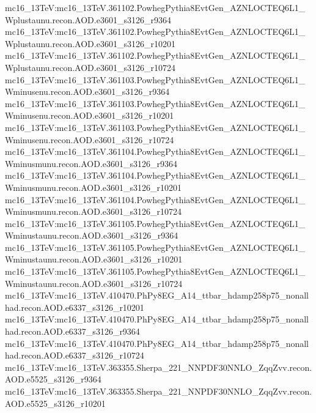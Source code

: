 { mc16\_13TeV:mc16\_13TeV.361102.PowhegPythia8EvtGen\_AZNLOCTEQ6L1\_Wplustaunu.recon.AOD.e3601\_s3126\_r9364\newline    
 mc16\_13TeV:mc16\_13TeV.361102.PowhegPythia8EvtGen\_AZNLOCTEQ6L1\_Wplustaunu.recon.AOD.e3601\_s3126\_r10201\newline    
 mc16\_13TeV:mc16\_13TeV.361102.PowhegPythia8EvtGen\_AZNLOCTEQ6L1\_Wplustaunu.recon.AOD.e3601\_s3126\_r10724\newline    
 mc16\_13TeV:mc16\_13TeV.361103.PowhegPythia8EvtGen\_AZNLOCTEQ6L1\_Wminusenu.recon.AOD.e3601\_s3126\_r9364\newline    
 mc16\_13TeV:mc16\_13TeV.361103.PowhegPythia8EvtGen\_AZNLOCTEQ6L1\_Wminusenu.recon.AOD.e3601\_s3126\_r10201\newline    
 mc16\_13TeV:mc16\_13TeV.361103.PowhegPythia8EvtGen\_AZNLOCTEQ6L1\_Wminusenu.recon.AOD.e3601\_s3126\_r10724\newline    
 mc16\_13TeV:mc16\_13TeV.361104.PowhegPythia8EvtGen\_AZNLOCTEQ6L1\_Wminusmunu.recon.AOD.e3601\_s3126\_r9364\newline    
 mc16\_13TeV:mc16\_13TeV.361104.PowhegPythia8EvtGen\_AZNLOCTEQ6L1\_Wminusmunu.recon.AOD.e3601\_s3126\_r10201\newline    
 mc16\_13TeV:mc16\_13TeV.361104.PowhegPythia8EvtGen\_AZNLOCTEQ6L1\_Wminusmunu.recon.AOD.e3601\_s3126\_r10724\newline    
 mc16\_13TeV:mc16\_13TeV.361105.PowhegPythia8EvtGen\_AZNLOCTEQ6L1\_Wminustaunu.recon.AOD.e3601\_s3126\_r9364\newline    
 mc16\_13TeV:mc16\_13TeV.361105.PowhegPythia8EvtGen\_AZNLOCTEQ6L1\_Wminustaunu.recon.AOD.e3601\_s3126\_r10201\newline    
 mc16\_13TeV:mc16\_13TeV.361105.PowhegPythia8EvtGen\_AZNLOCTEQ6L1\_Wminustaunu.recon.AOD.e3601\_s3126\_r10724\newline    
 mc16\_13TeV:mc16\_13TeV.410470.PhPy8EG\_A14\_ttbar\_hdamp258p75\_nonallhad.recon.AOD.e6337\_s3126\_r10201\newline    
 mc16\_13TeV:mc16\_13TeV.410470.PhPy8EG\_A14\_ttbar\_hdamp258p75\_nonallhad.recon.AOD.e6337\_s3126\_r9364\newline    
 mc16\_13TeV:mc16\_13TeV.410470.PhPy8EG\_A14\_ttbar\_hdamp258p75\_nonallhad.recon.AOD.e6337\_s3126\_r10724\newline    
 mc16\_13TeV:mc16\_13TeV.363355.Sherpa\_221\_NNPDF30NNLO\_ZqqZvv.recon.AOD.e5525\_s3126\_r9364\newline    
 mc16\_13TeV:mc16\_13TeV.363355.Sherpa\_221\_NNPDF30NNLO\_ZqqZvv.recon.AOD.e5525\_s3126\_r10201\newline    
}

